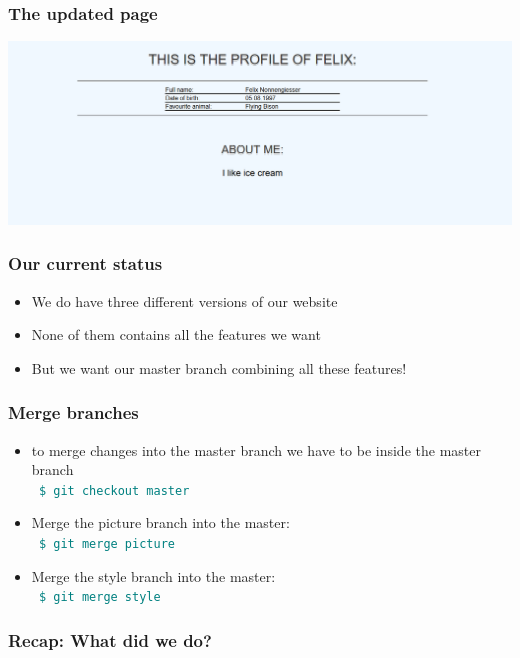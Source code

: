 \documentclass[aspectratio=169]{beamer}
\newcommand{\shellcmd}[1]{~\\ \indent\indent\texttt{\textcolor{teal}{ \$ #1}\\}}
\begin{document}

\begin{frame}
\frametitle{The updated page}
\centering
\includegraphics[width=.9\textwidth]{graphics/profile_with_css.png}
\end{frame}


\begin{frame}
\frametitle{Our current status}
\begin{itemize}
	\item We do have three different versions of our website
	\item None of them contains all the features we want
	\item But we want our master branch combining all these features!
\end{itemize}
\end{frame}



\begin{frame}
\frametitle{Merge branches}
\begin{itemize}
	\item to merge changes into the master branch we have to be inside the master branch \shellcmd{git checkout master}
	\item \vspace{.5cm}Merge the picture branch into the master: \shellcmd{git merge picture} 
	\item Merge the style branch into the master: \shellcmd{git merge style} 
\end{itemize}
\end{frame}


\begin{frame}
\frametitle{Recap: What did we do?}
\end{frame}
\end{document}
